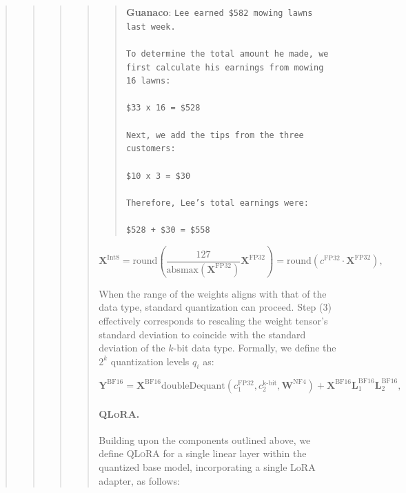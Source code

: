 \begin{quote}
\begin{quote}
\begin{quote}
\begin{quote}
\begin{quote}
    \textbf{Guanaco}: \texttt{Lee earned \$582 mowing lawns last week. \\ \\ To determine the total amount he made, we first calculate his earnings from mowing 16 lawns: \\ \\  \$33 x 16 = \$528 \\ \\ Next, we add the tips from the three customers: \\  \\ \$10 x 3 = \$30 \\ \\ Therefore, Lee’s total earnings were: \\ \\ \$528 + \$30 = \$558}
\end{quote}

\begin{equation}
    \mathbf{X}^{ \text{Int8}} = \text{round}\left( \frac{127}{{\text{absmax}}(\mathbf{X}^{{\text{FP32}}})}\mathbf{X}^{{\text{FP32}}} \right) = \text{round}(c^{\text{FP32}}\cdot \mathbf{X}^{{\text{FP32}}}),
\end{equation}

When the range of the weights aligns with that of the data type, standard quantization can proceed. Step (3) effectively corresponds to rescaling the weight tensor’s standard deviation to coincide with the standard deviation of the $k$-bit data type. Formally, we define the $2^k$ quantization levels $q_i$ as:

\begin{equation}
    \mathbf{Y}^{\text{BF16}} =  \mathbf{X}^{\text{BF16}} \text{doubleDequant}(c_1^{\text{FP32}}, c_2^{\text{k-bit}}, \mathbf{W}^{\text{NF4}}) + \mathbf{X}^{\text{BF16}}\mathbf{L}^{\text{BF16}}_1\mathbf{L}^{\text{BF16}}_2,
\end{equation}

\paragraph{\textsc{QLoRA}.} Building upon the components outlined above, we define \textsc{QLoRA} for a single linear layer within the quantized base model, incorporating a single LoRA adapter, as follows:


\end{quote}
\end{quote}
\end{quote}
\end{quote}
